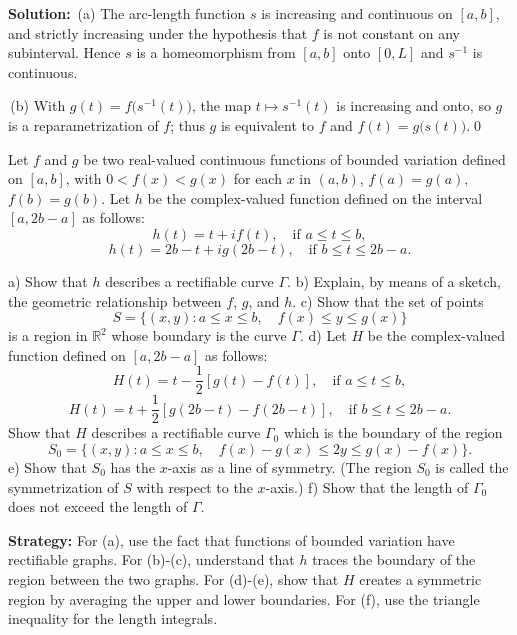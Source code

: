 \bigskip\noindent\textbf{Solution:}
\,(a) The arc-length function $s$ is increasing and continuous on $[a,b]$, and strictly increasing under the hypothesis that $f$ is not constant on any subinterval. Hence $s$ is a homeomorphism from $[a,b]$ onto $[0,L]$ and $s^{-1}$ is continuous.

\,(b) With $g(t)=f\big(s^{-1}(t)\big)$, the map $t\mapsto s^{-1}(t)$ is increasing and onto, so $g$ is a reparametrization of $f$; thus $g$ is equivalent to $f$ and $f(t)=g\big(s(t)\big)$.\qed


\begin{problembox}
\begin{problemstatement}
Let $f$ and $g$ be two real-valued continuous functions of bounded variation defined on $[a, b]$, with $0 < f(x) < g(x)$ for each $x$ in $(a, b)$, $f(a) = g(a)$, $f(b) = g(b)$. Let $h$ be the complex-valued function defined on the interval $[a, 2b - a]$ as follows:
\[h(t) = t + i f(t), \quad \text{if } a \leq t \leq b,\]
\[h(t) = 2b - t + ig(2b - t), \quad \text{if } b \leq t \leq 2b - a.\]

a) Show that $h$ describes a rectifiable curve $\Gamma$.
b) Explain, by means of a sketch, the geometric relationship between $f$, $g$, and $h$.
c) Show that the set of points
\[S = \{ (x, y) : a \leq x \leq b, \quad f(x) \leq y \leq g(x) \}\]
is a region in $\mathbb{R}^2$ whose boundary is the curve $\Gamma$.
d) Let $H$ be the complex-valued function defined on $[a, 2b - a]$ as follows:
\[H(t) = t - \frac{1}{2} [g(t) - f(t)], \quad \text{if } a \leq t \leq b,\]
\[H(t) = t + \frac{1}{2} [g(2b - t) - f(2b - t)], \quad \text{if } b \leq t \leq 2b - a.\]
Show that $H$ describes a rectifiable curve $\Gamma_0$ which is the boundary of the region
\[S_0 = \{ (x, y) : a \leq x \leq b, \quad f(x) - g(x) \leq 2y \leq g(x) - f(x) \}.\]
e) Show that $S_0$ has the $x$-axis as a line of symmetry. (The region $S_0$ is called the symmetrization of $S$ with respect to the $x$-axis.)
f) Show that the length of $\Gamma_0$ does not exceed the length of $\Gamma$.
\end{problemstatement}
\end{problembox}

\noindent\textbf{Strategy:} For (a), use the fact that functions of bounded variation have rectifiable graphs. For (b)-(c), understand that $h$ traces the boundary of the region between the two graphs. For (d)-(e), show that $H$ creates a symmetric region by averaging the upper and lower boundaries. For (f), use the triangle inequality for the length integrals.

